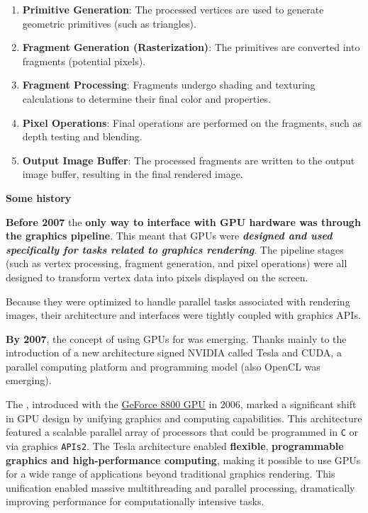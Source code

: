 \begin{examplebox}
\begin{enumerate}
        \item \textbf{Primitive Generation}: The processed vertices are used to generate geometric primitives (such as triangles).
        
        \item \textbf{Fragment Generation (Rasterization)}: The primitives are converted into fragments (potential pixels).
        
        \item \textbf{Fragment Processing}: Fragments undergo shading and texturing calculations to determine their final color and properties.
        
        \item \textbf{Pixel Operations}: Final operations are performed on the fragments, such as depth testing and blending.
        
        \item \textbf{Output Image Buffer}: The processed fragments are written to the output image buffer, resulting in the final rendered image.
    \end{enumerate}
\end{examplebox}

\begin{flushleft}
    \textcolor{Green3}{ \textbf{Some history}}
\end{flushleft}
\textbf{Before 2007} the \textbf{only way to interface with GPU hardware was through the graphics pipeline}. This meant that GPUs were \emph{\textbf{designed and used specifically for tasks related to graphics rendering}}. The pipeline stages (such as vertex processing, fragment generation, and pixel operations) were all designed to transform vertex data into pixels displayed on the screen.

\highspace
Because they were optimized to handle parallel tasks associated with rendering images, their architecture and interfaces were tightly coupled with graphics APIs.

\highspace
\textbf{By 2007}, the concept of using GPUs for  was emerging. Thanks mainly to the introduction of a new architecture signed NVIDIA called Tesla and CUDA, a parallel computing platform and programming model (also OpenCL was emerging).

\highspace
The , introduced with the \href{https://www.techpowerup.com/gpu-specs/geforce-8800-gt.c201}{GeForce 8800 GPU} in 2006, marked a significant shift in GPU design by unifying graphics and computing capabilities. This architecture featured a scalable parallel array of processors that could be programmed in \texttt{C} or via graphics \texttt{APIs2}. The Tesla architecture enabled \textbf{flexible}, \textbf{programmable graphics and high-performance computing}, making it possible to use GPUs for a wide range of applications beyond traditional graphics rendering. This unification enabled massive multithreading and parallel processing, dramatically improving performance for computationally intensive tasks.\cite{lindholm2008nvidia}

